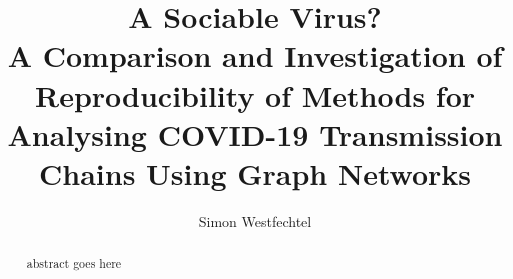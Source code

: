 \documentclass[12pt,a4paper]{report}
\title{
	A Sociable Virus? \\
	A Comparison and Investigation of Reproducibility of Methods for Analysing COVID-19 Transmission Chains Using Graph Networks
}
\author{Simon Westfechtel}
\begin{document}
	\maketitle
	\begin{abstract}
		abstract goes here
	\end{abstract}
	
	
	
	
	
	\printbibliography
\end{document}
